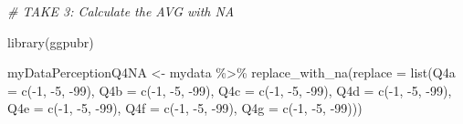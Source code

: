 \documentclass[
]{article}
\newenvironment{Shaded}{\begin{snugshade}}{\end{snugshade}}
\newcommand{\AttributeTok}[1]{\textcolor[rgb]{0.77,0.63,0.00}{#1}}
\newcommand{\CommentTok}[1]{\textcolor[rgb]{0.56,0.35,0.01}{\textit{#1}}}
\newcommand{\DecValTok}[1]{\textcolor[rgb]{0.00,0.00,0.81}{#1}}
\newcommand{\FunctionTok}[1]{\textcolor[rgb]{0.00,0.00,0.00}{#1}}
\newcommand{\NormalTok}[1]{#1}
\newcommand{\OtherTok}[1]{\textcolor[rgb]{0.56,0.35,0.01}{#1}}
\newcommand{\SpecialCharTok}[1]{\textcolor[rgb]{0.00,0.00,0.00}{#1}}
\begin{document}
\begin{Shaded}
\begin{Highlighting}[]
\CommentTok{\# TAKE 3: Calculate the AVG with NA}

\FunctionTok{library}\NormalTok{(ggpubr)}

\NormalTok{myDataPerceptionQ4NA }\OtherTok{\textless{}{-}}\NormalTok{ mydata }\SpecialCharTok{\%\textgreater{}\%} \FunctionTok{replace\_with\_na}\NormalTok{(}\AttributeTok{replace =} \FunctionTok{list}\NormalTok{(}\AttributeTok{Q4a =} \FunctionTok{c}\NormalTok{(}\SpecialCharTok{{-}}\DecValTok{1}\NormalTok{, }\SpecialCharTok{{-}}\DecValTok{5}\NormalTok{, }\SpecialCharTok{{-}}\DecValTok{99}\NormalTok{), }\AttributeTok{Q4b =} \FunctionTok{c}\NormalTok{(}\SpecialCharTok{{-}}\DecValTok{1}\NormalTok{, }\SpecialCharTok{{-}}\DecValTok{5}\NormalTok{, }\SpecialCharTok{{-}}\DecValTok{99}\NormalTok{), }\AttributeTok{Q4c =} \FunctionTok{c}\NormalTok{(}\SpecialCharTok{{-}}\DecValTok{1}\NormalTok{, }\SpecialCharTok{{-}}\DecValTok{5}\NormalTok{, }\SpecialCharTok{{-}}\DecValTok{99}\NormalTok{), }\AttributeTok{Q4d =} \FunctionTok{c}\NormalTok{(}\SpecialCharTok{{-}}\DecValTok{1}\NormalTok{, }\SpecialCharTok{{-}}\DecValTok{5}\NormalTok{, }\SpecialCharTok{{-}}\DecValTok{99}\NormalTok{), }\AttributeTok{Q4e =} \FunctionTok{c}\NormalTok{(}\SpecialCharTok{{-}}\DecValTok{1}\NormalTok{, }\SpecialCharTok{{-}}\DecValTok{5}\NormalTok{, }\SpecialCharTok{{-}}\DecValTok{99}\NormalTok{), }\AttributeTok{Q4f =} \FunctionTok{c}\NormalTok{(}\SpecialCharTok{{-}}\DecValTok{1}\NormalTok{, }\SpecialCharTok{{-}}\DecValTok{5}\NormalTok{, }\SpecialCharTok{{-}}\DecValTok{99}\NormalTok{), }\AttributeTok{Q4g =} \FunctionTok{c}\NormalTok{(}\SpecialCharTok{{-}}\DecValTok{1}\NormalTok{, }\SpecialCharTok{{-}}\DecValTok{5}\NormalTok{, }\SpecialCharTok{{-}}\DecValTok{99}\NormalTok{)))}


\end{Highlighting}
\end{Shaded}
\end{document}
